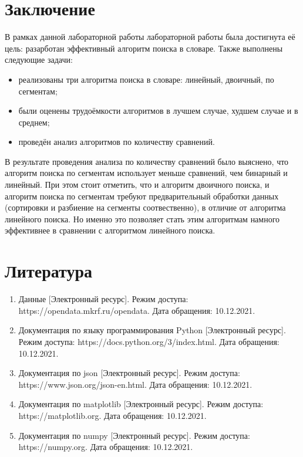 \documentclass[12pt]{report}
\begin{document}
\chapter*{Заключение}
	
В рамках данной лабораторной работы лабораторной работы была достигнута её цель: разарботан эффективный алгоритм поиска в словаре. Также выполнены следующие задачи:
\begin{itemize}
	\item реализованы три алгоритма поиска в словаре: линейный, двоичный, по сегментам;
	\item были оценены трудоёмкости алгоритмов в лучшем случае, худшем случае и в среднем;
	\item проведён анализ алгоритмов по количеству сравнений.
\end{itemize}

В результате проведения анализа по количеству сравнений было выяснено, что алгоритм поиска по сегментам использует меньше сравнений, чем бинарный и линейный. При этом стоит отметить, что и алгоритм двоичного поиска, и алгоритм поиска по сегментам требуют предварительный обработки данных (сортировки и разбиение на сегменты соотвественно), в отличие от алгоритма линейного поиска. Но именно это позволяет стать этим алгоритмам намного эффективнее в сравнении с алгоритмом линейного поиска.
\chapter*{Литература}
\begin{enumerate}
    \item Данные [Электронный ресурс]. Режим доступа: https://opendata.mkrf.ru/opendata. Дата обращения: 10.12.2021.
	\item Документация по языку программирования Python [Электронный ресурс]. Режим доступа: https://docs.python.org/3/index.html. Дата обращения: 10.12.2021.
	    \item Документация по json [Электронный ресурс]. Режим доступа: https://www.json.org/json-en.html. Дата обращения: 10.12.2021.
	\item Документация по matplotlib [Электронный ресурс]. Режим доступа: https://matplotlib.org. Дата обращения: 10.12.2021.
	\item Документация по numpy [Электронный ресурс]. Режим доступа: https://numpy.org. Дата обращения: 10.12.2021.
\end{enumerate}
\end{document}
